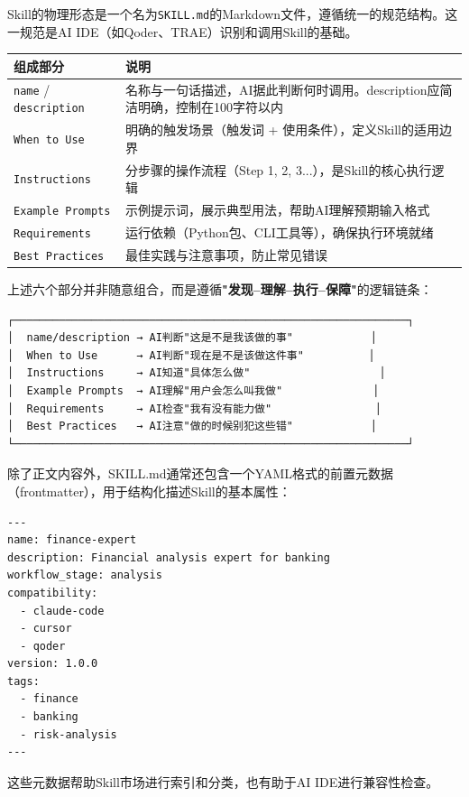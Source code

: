 Skill的物理形态是一个名为\texttt{SKILL.md}的Markdown文件，遵循统一的规范结构。这一规范是AI IDE（如Qoder、TRAE）识别和调用Skill的基础。

\begin{table}[H]
\centering
\begin{tabular}{lp{9cm}}
\toprule
\textbf{组成部分} & \textbf{说明} \\
\midrule
\texttt{name} / \texttt{description} & 名称与一句话描述，AI据此判断何时调用。description应简洁明确，控制在100字符以内 \\
\texttt{When to Use} & 明确的触发场景（触发词 + 使用条件），定义Skill的适用边界 \\
\texttt{Instructions} & 分步骤的操作流程（Step 1, 2, 3...），是Skill的核心执行逻辑 \\
\texttt{Example Prompts} & 示例提示词，展示典型用法，帮助AI理解预期输入格式 \\
\texttt{Requirements} & 运行依赖（Python包、CLI工具等），确保执行环境就绪 \\
\texttt{Best Practices} & 最佳实践与注意事项，防止常见错误 \\
\bottomrule
\end{tabular}
\end{table}

上述六个部分并非随意组合，而是遵循\textbf{"发现--理解--执行--保障"}的逻辑链条：

\begin{verbatim}
┌─────────────────────────────────────────────────────────────┐
│  name/description → AI判断"这是不是我该做的事"            │
│  When to Use      → AI判断"现在是不是该做这件事"          │
│  Instructions     → AI知道"具体怎么做"                    │
│  Example Prompts  → AI理解"用户会怎么叫我做"              │
│  Requirements     → AI检查"我有没有能力做"                │
│  Best Practices   → AI注意"做的时候别犯这些错"            │
└─────────────────────────────────────────────────────────────┘
\end{verbatim}

\begin{notebox}
除了正文内容外，SKILL.md通常还包含一个YAML格式的前置元数据（frontmatter），用于结构化描述Skill的基本属性：
\begin{lstlisting}[style=json]
---
name: finance-expert
description: Financial analysis expert for banking
workflow_stage: analysis
compatibility:
  - claude-code
  - cursor
  - qoder
version: 1.0.0
tags:
  - finance
  - banking
  - risk-analysis
---
\end{lstlisting}
这些元数据帮助Skill市场进行索引和分类，也有助于AI IDE进行兼容性检查。
\end{notebox}

